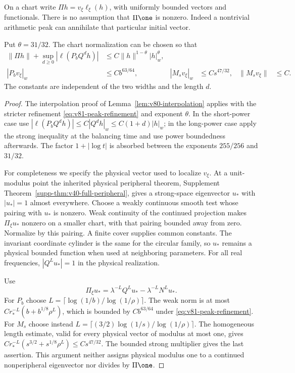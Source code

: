 On a chart write $\Pi h=v_\xi\ell_\xi(h)$, with uniformly bounded
vectors and functionals. There is no assumption that $\Pi\one$ is
nonzero. Indeed a nontrivial arithmetic peak can annihilate that
particular initial vector.

\begin{lemma}
\label{lem:v81-peaks}
Put $\theta=31/32$. The chart normalization can be chosen so that
\begin{align}
 \|\Pi h\|+\sup_{d\ge0}|\ell(P_bQ^dh)|
       &\le C\|h\|^{1-\theta}|h|_w^\theta,
                                              \label{eq:v81-interpolation}\\
 |P_bv_\xi|_w&\le Cb^{63/64},&
 |M_sv_\xi|_w&\le Cs^{47/32},&\|M_sv_\xi\|&\le C.
                                              \label{eq:v81-eigen-local}
\end{align}
The constants are independent of the two widths and the length $d$.
\end{lemma}
\begin{proof}
The interpolation proof of Lemma~\ref{lem:v80-interpolation} applies
with the stricter refinement \eqref{eq:v81-peak-refinement} and
exponent $\theta$. In the short-power case use
$|\ell(P_bQ^dh)|\le C|Q^dh|_w\le C(1+d)|h|_w$;
in the long-power case apply the strong inequality at the balancing
time and use power boundedness afterwards. The factor $1+|\log t|$
is absorbed between the exponents $255/256$ and $31/32$.

For completeness we specify the physical vector used to localize
$v_\xi$. At a unit-modulus point the inherited physical peripheral
 theorem, Supplement Theorem~\ref{supp-thm:v40-full-peripheral}, gives
a strong-space eigenvector $u_*$ with $|u_*|=1$ almost everywhere.
Choose a weakly continuous smooth test whose pairing with $u_*$ is
nonzero. Weak continuity of the continued projection makes
$\Pi_\xi u_*$ nonzero on a smaller chart, with that pairing bounded
away from zero. Normalize by this pairing. A finite cover supplies
common constants. The invariant coordinate cylinder is the same
for the circular family, so $u_*$ remains a physical bounded function
when used at neighboring parameters. For all real frequencies,
$|Q^Lu_*|=1$ in the physical realization.

Use
\[
 \Pi_\xi u_*=\lambda^{-L}Q^Lu_*-\lambda^{-L}N^Lu_*.
\]
For $P_b$ choose $L=\lceil\log(1/b)/\log(1/\rho)\rceil$.
The weak norm is at most $Cr_*^{-L}(b+b^{1/8}\rho^L)$,
which is bounded by $Cb^{63/64}$ under
\eqref{eq:v81-peak-refinement}. For $M_s$ choose instead
$L=\lceil(3/2)\log(1/s)/\log(1/\rho)\rceil$.
The homogeneous length estimate, valid for every physical vector
of modulus at most one, gives
$Cr_*^{-L}(s^{3/2}+s^{1/8}\rho^L)\le Cs^{47/32}$.
The bounded strong multiplier gives the last assertion. This
argument neither assigns physical modulus one to a continued
nonperipheral eigenvector nor divides by $\Pi\one$.
\end{proof}

